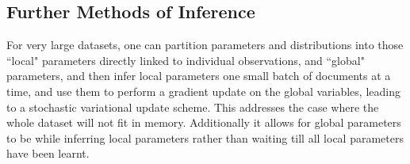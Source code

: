 \subsection*{Further Methods of Inference}
For very large datasets, one can partition parameters and distributions into those ``local" parameters directly linked to individual observations, and ``global" parameters, and then infer local parameters one small batch of documents at a time, and use them to perform a gradient update\cite{RobbinsMonro1951} on the global variables, leading to a stochastic variational update scheme\cite{Hoffman2012}. This addresses the case where the whole dataset will not fit in memory. Additionally it allows for global parameters to be while inferring local parameters rather than waiting till all local parameters have been learnt.
 
